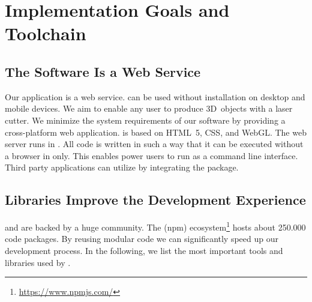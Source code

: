 \documentclass[../ClassicThesis.tex]{subfiles}
\begin{document}
\chapter{Implementation Goals and Toolchain}
\label{ch:toolchain}


\section{The Software Is a Web Service}

Our application {\platener} is a web service. {\platener}
can be used without installation on desktop and mobile
devices. We aim to enable any user to produce 3D~objects
with a laser cutter. We minimize the system requirements of
our software by providing a cross-platform web application.
{\platener} is based on HTML~5, CSS, {\coffeescript} and
WebGL. The web server runs in {\nodejs}. All code is written
in such a way that it can be executed without a browser in
{\nodejs} only. This enables power users to run {\platener}
as a command line interface. Third party applications can
utilize {\platener} by integrating the {\nodejs} package.

\section{Libraries Improve the Development Experience}

{\javascript} and {\nodejs} are backed by a huge community.
The  (npm)
ecosystem\footnote{\url{https://www.npmjs.com/}} hosts about
250.000 code packages. By reusing modular code we can
significantly speed up our development process. In the
following, we list the most important tools and libraries
used by {\platener}.
\end{document}
